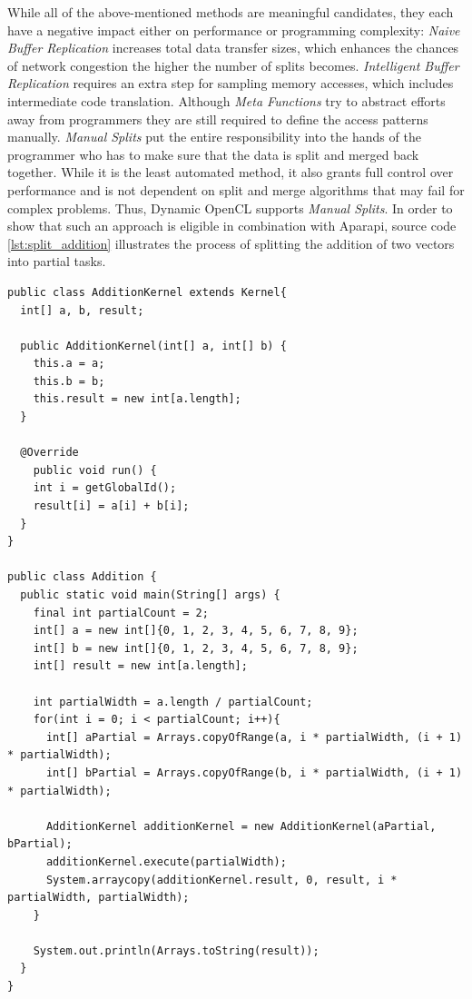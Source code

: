 While all of the above-mentioned methods are meaningful candidates, they each have a negative impact either on performance or programming complexity: \textit{Naive Buffer Replication} increases total data transfer sizes, which enhances the chances of network congestion the higher the number of splits becomes. \textit{Intelligent Buffer Replication} requires an extra step for sampling memory accesses, which includes intermediate code translation. Although \textit{Meta Functions} try to abstract efforts away from programmers they are still required to define the access patterns manually. \textit{Manual Splits} put the entire responsibility into the hands of the programmer who has to make sure that the data is split and merged back together. While it is the least automated method, it also grants full control over performance and is not dependent on split and merge algorithms that may fail for complex problems. Thus, Dynamic OpenCL supports \textit{Manual Splits}. In order to show that such an approach is eligible in combination with Aparapi, source code \ref{lst:split_addition} illustrates the process of splitting the addition of two vectors into partial tasks.


\begin{lstlisting}[caption=Partial Aparapi Vector Addition Kernel,captionpos=b,label=lst:split_addition]
public class AdditionKernel extends Kernel{
  int[] a, b, result;

  public AdditionKernel(int[] a, int[] b) {
    this.a = a;
    this.b = b;
    this.result = new int[a.length];
  }

  @Override
    public void run() {
    int i = getGlobalId();
    result[i] = a[i] + b[i];
  }
}

public class Addition {
  public static void main(String[] args) {
    final int partialCount = 2;
	int[] a = new int[]{0, 1, 2, 3, 4, 5, 6, 7, 8, 9};
	int[] b = new int[]{0, 1, 2, 3, 4, 5, 6, 7, 8, 9};
	int[] result = new int[a.length];

	int partialWidth = a.length / partialCount;
	for(int i = 0; i < partialCount; i++){
      int[] aPartial = Arrays.copyOfRange(a, i * partialWidth, (i + 1) * partialWidth);
      int[] bPartial = Arrays.copyOfRange(b, i * partialWidth, (i + 1) * partialWidth);

	  AdditionKernel additionKernel = new AdditionKernel(aPartial, bPartial);
      additionKernel.execute(partialWidth);
      System.arraycopy(additionKernel.result, 0, result, i * partialWidth, partialWidth);
	}

	System.out.println(Arrays.toString(result));
  }
}

\end{lstlisting}

